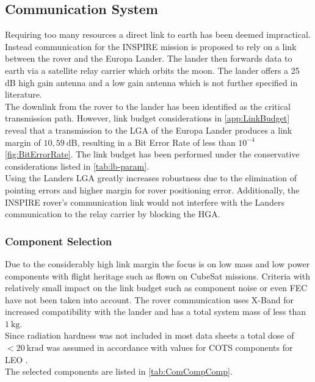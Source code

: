 \subsection{Communication System}
Requiring too many resources a direct link to earth has been deemed impractical. Instead communication for the INSPIRE mission is proposed to rely on a link between the rover and the Europa Lander. The lander then forwards data to earth via a satellite relay carrier which orbits the moon. The lander offers a 25 dB high gain antenna \cite{Lander_HGA} and a low gain antenna which is not further specified in literature.\\

The downlink from the rover to the lander has been identified as the critical transmission path. However, link budget considerations in \autoref{app:LinkBudget} reveal that a transmission to the LGA of the Europa Lander produces a link margin of $10,59~\text{dB}$, resulting in a Bit Error Rate of less than $10^{-4}$ \autoref{fig:BitErrorRate}. The link budget has been performed under the conservative considerations listed in \autoref{tab:lb-param}.\\

Using the Landers LGA greatly increases robustness due to the elimination of pointing errors and higher margin for rover positioning error. Additionally, the INSPIRE rover’s communication link would not interfere with the Landers communication to the relay carrier by blocking the HGA.

\subsubsection{Component Selection}

Due to the considerably high link margin the focus is on low mass and low power components with flight heritage such as flown on CubeSat missions. Criteria with relatively small impact on the link budget such as component noise or even FEC have not been taken into account. The rover communication uses X-Band for increased compatibility with the lander and has a total system mass of less than $1~\text{kg}$. \\
Since radiation hardness was not included in most data sheets a total dose of $<20~\text{krad}$ was assumed in accordance with values for COTS components for LEO \cite{COTS_Rad}. \\

The selected components are listed in \autoref{tab:ComCompComp}. 

